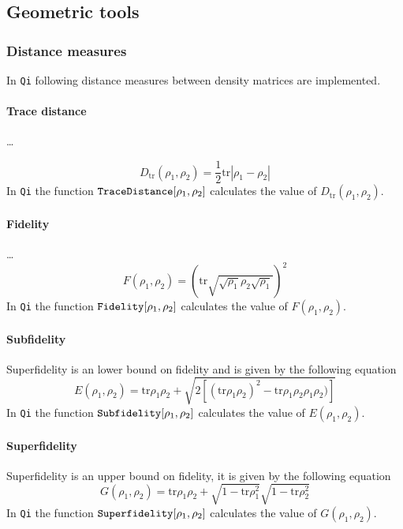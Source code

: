 \documentclass[11pt,a4paper]{article}
\newcommand{\qi}{\texttt{Qi}}
\newcommand{\tr}{\mathrm{tr}}
\newcommand{\1}{{\bf 1}}
\newcommand{\fname}[1]{\text{\texttt{#1}}}
\begin{document}
\subsection{Geometric tools}

\subsubsection{Distance measures}
In \qi{} following distance measures between density matrices are implemented.

\paragraph{Trace distance} \ldots 

\begin{equation}
D_{\tr}(\rho_1,\rho_2)=\frac12\tr|\rho_1-\rho_2|
\end{equation}
In \qi{} the function $\fname{TraceDistance}[\rho_1,\rho_2]$ calculates the 
value of $D_{\tr}(\rho_1,\rho_2)$.

\paragraph{Fidelity}  \ldots
\begin{equation}
F(\rho_1,\rho_2)=
\left(\tr\sqrt{\sqrt{\rho_1}\rho_2\sqrt{\rho_1}}\right)^2
\end{equation}
In \qi{} the function $\fname{Fidelity}[\rho_1,\rho_2]$ calculates the 
value of $F(\rho_1,\rho_2)$.

\paragraph{Subfidelity}
Superfidelity is an lower bound on fidelity 
\cite{miszczak2008sup}
and is given by the following equation
\begin{equation}
E(\rho_1,\rho_2)=
\tr\rho_1\rho_2+\sqrt{2[(\tr\rho_1\rho_2)^2-\tr\rho_1\rho_2\rho_1\rho_2)]}
\end{equation}
In \qi{} the function $\fname{Subfidelity}[\rho_1,\rho_2]$ calculates the 
value of $E(\rho_1,\rho_2)$.

\paragraph{Superfidelity} Superfidelity is an upper bound on fidelity,
it is given by the following equation
\begin{equation}
G(\rho_1,\rho_2)=\tr\rho_1\rho_2+\sqrt{1-\tr\rho_1^2}\sqrt{1-\tr\rho_2^2}
\end{equation}
In \qi{} the function $\fname{Superfidelity}[\rho_1,\rho_2]$ calculates the 
value of $G(\rho_1,\rho_2)$.
\end{document}
